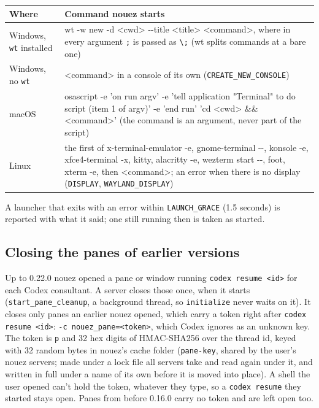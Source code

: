 \documentclass[10pt,a4paper]{article}
\newcommand{\code}[1]{\texttt{#1}}
\begin{document}
\begin{center}\small
\begin{tabularx}{\textwidth}{@{}l >{\ttfamily\raggedright\arraybackslash}X@{}}
\toprule
\textbf{Where} & \textrm{\textbf{Command nouez starts}} \\
\midrule
Windows, \code{wt} installed & wt -w new -d <cwd> -{}-title <title> <command>, where in every argument \code{;} is passed as \code{\textbackslash;} (wt splits commands at a bare one) \\
Windows, no \code{wt} & <command> in a console of its own (\code{CREATE\_NEW\_CONSOLE}) \\
macOS & osascript -e 'on run argv' -e 'tell application "Terminal" to do script (item 1 of argv)' -e 'end run' 'cd <cwd> \&\& <command>' (the command is an argument, never part of the script) \\
Linux & the first of x-terminal-emulator -e, gnome-terminal -{}-, konsole -e, xfce4-terminal -x, kitty, alacritty -e, wezterm start -{}-, foot, xterm -e, then <command>; an error when there is no display (\code{DISPLAY}, \code{WAYLAND\_DISPLAY}) \\
\bottomrule
\end{tabularx}
\end{center}

A launcher that exits with an error within \code{LAUNCH\_GRACE} (1.5 seconds) is reported with what
it said; one still running then is taken as started.

\subsection{Closing the panes of earlier versions}
\label{sec:old-panes}

Up to 0.22.0 nouez opened a pane or window running \code{codex resume <id>} for each Codex
consultant. A server closes those once, when it starts (\code{start\_pane\_cleanup}, a background
thread, so \code{initialize} never waits on it). It closes only panes an earlier nouez opened, which
carry a token right after \code{codex resume <id>}: \code{-c nouez\_pane=<token>}, which Codex ignores
as an unknown key. The token is \code{p} and 32 hex digits of HMAC-SHA256 over the thread id, keyed
with 32 random bytes in nouez's cache folder (\code{pane-key}, shared by the user's nouez servers;
made under a lock file all servers take and read again under it, and written in full under a name
of its own before it is moved into place). A shell the user opened can't hold the token, whatever
they type, so a \code{codex resume} they started stays open. Panes from before 0.16.0 carry no token
and are left open too.
\end{document}
